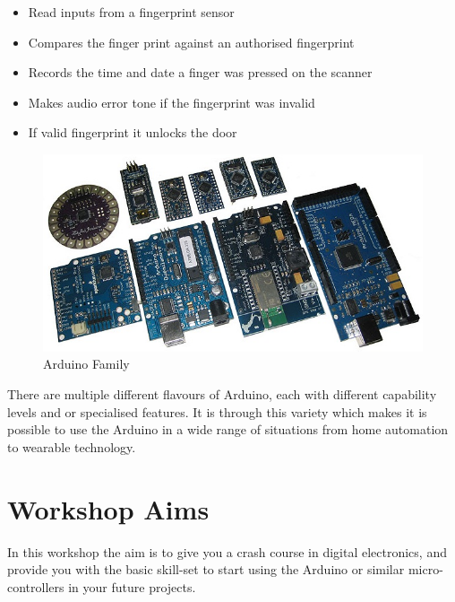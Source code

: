 \begin{itemize}
	\item Read inputs from a fingerprint sensor
	\item Compares the finger print against an authorised fingerprint
	\item Records the time and date a finger was pressed on the scanner
	\item Makes audio error tone if the fingerprint was invalid
	\item If valid fingerprint it unlocks the door
\end{itemize}

%
\begin{figure}[ht]
	\centering
	\includegraphics[width=12cm]{images/10}
	\caption{Arduino Family}
	\label{fig:arduino_family}
\end{figure}
%

There are multiple different flavours of \gls{Arduino}, each with different capability levels and or specialised features. It is through this variety which makes it is possible to use the Arduino in a wide range of situations from home automation to wearable technology.

\newpage
\section*{Workshop Aims}
In this workshop the aim is to give you a crash course in digital electronics, and provide you with the basic skill-set to start using the Arduino or similar micro-controllers in your future projects.

